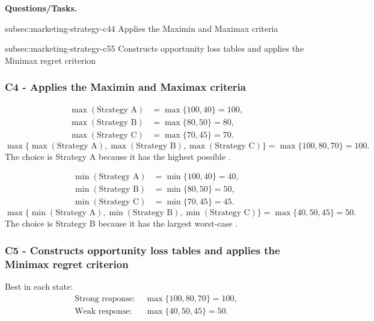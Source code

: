 	\textbf{Questions/Tasks.}
	\begin{enumerate}
		\CriterionTask
		{subsec:marketing-strategy-c4}{4}
		{Applies the Maximin and Maximax criteria}

		\CriterionTask
		{subsec:marketing-strategy-c5}{5}
		{Constructs opportunity loss tables and applies the Minimax regret criterion}
	\end{enumerate}
	
	\subsubsection*{C4 - Applies the Maximin and Maximax criteria}
	\label{subsec:marketing-strategy-c4}
	
	\[
	\begin{aligned}
		\max(\text{Strategy A}) &= \max\{100,40\}=100,\\
		\max(\text{Strategy B}) &= \max\{80,50\}=80,\\
		\max(\text{Strategy C}) &= \max\{70,45\}=70.
	\end{aligned}
	\]
	\[
	\max\{\max(\text{Strategy A}),\max(\text{Strategy B}),
	\max(\text{Strategy C})\}
	=\max\{100,80,70\}
	=100.
	\]
	The  choice is Strategy A because it has the highest possible .
	
	\[
	\begin{aligned}
		\min(\text{Strategy A}) &= \min\{100,40\}=40,\\
		\min(\text{Strategy B}) &= \min\{80,50\}=50,\\
		\min(\text{Strategy C}) &= \min\{70,45\}=45.
	\end{aligned}
	\]
	\[
	\max\{\min(\text{Strategy A}),\min(\text{Strategy B}),
	\min(\text{Strategy C})\}
	=\max\{40,50,45\}
	=50.
	\]
	The  choice is Strategy B because it has the largest worst-case .
	
	\subsubsection*{C5 - Constructs opportunity loss tables and applies the Minimax regret criterion}
	\label{subsec:marketing-strategy-c5}
	
	Best  in each state:
	\[
	\begin{aligned}
		\text{Strong response: }&\max\{100,80,70\}=100,\\
		\text{Weak response: }&\max\{40,50,45\}=50.
	\end{aligned}
	\]
	
